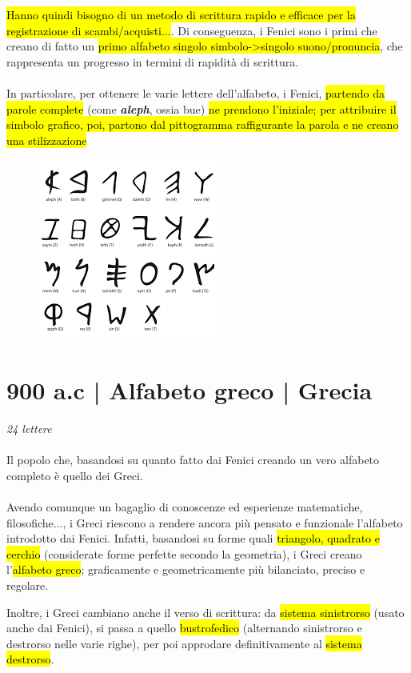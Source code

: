 \hl{Hanno quindi bisogno di un metodo di scrittura rapido e efficace per la registrazione di scambi/acquisti...}. Di conseguenza, i Fenici sono i primi che creano di fatto un \hl{primo alfabeto singolo simbolo->singolo suono/pronuncia}, che rappresenta un progresso in termini di rapidità di scrittura.
\\\\
In particolare, per ottenere le varie lettere dell'alfabeto, i Fenici, \hl{partendo da parole complete }(come \textbf{\textit{aleph}}, ossia bue) \hl{ne prendono l'iniziale; per attribuire il simbolo grafico, poi, partono dal pittogramma raffigurante la parola e ne creano una stilizzazione}

\begin{figure}[H]
    \centering
    \includegraphics[width=0.3\linewidth]{blocco_3 - storia della scrittura/imgs/images.png}
\end{figure}

\section{900 a.c | Alfabeto greco | Grecia}
{\huge \textit{24 lettere}}\\\\
Il popolo che, basandosi su quanto fatto dai Fenici creando un vero alfabeto completo è quello dei Greci.
\\\\
Avendo comunque un bagaglio di conoscenze ed esperienze matematiche, filosofiche..., i Greci riescono a rendere ancora più pensato e funzionale l'alfabeto introdotto dai Fenici.
Infatti, basandosi su forme quali \hl{triangolo, quadrato e cerchio} (considerate forme perfette secondo la geometria), i Greci creano l'\hl{alfabeto greco}; graficamente e geometricamente più bilanciato, preciso e regolare.

Inoltre, i Greci cambiano anche il verso di scrittura: da \hl{sistema sinistrorso} (usato anche dai Fenici), si passa a quello \hl{bustrofedico} (alternando sinistrorso e destrorso nelle varie righe), per poi approdare definitivamente al \hl{sistema destrorso}.

